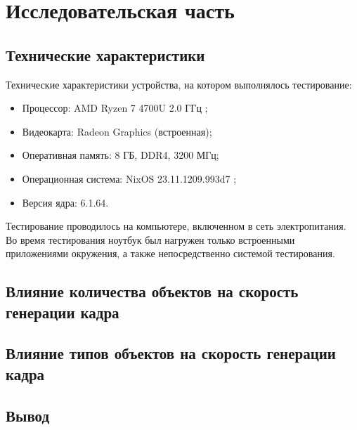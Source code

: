 \section{Исследовательская часть}


\subsection{Технические характеристики}

Технические характеристики устройства, на котором выполнялось тестирование:
\begin{itemize}
    \item Процессор: AMD Ryzen 7 4700U 2.0 ГГц \cite{amd};
    \item Видеокарта: Radeon Graphics (встроенная);
    \item Оперативная память: 8 ГБ, DDR4, 3200 МГц;
    \item Операционная система: NixOS 23.11.1209.993d7 \cite{nixos};
    \item Версия ядра: 6.1.64.
\end{itemize}

Тестирование проводилось на компьютере, включенном в сеть электропитания.
Во время тестирования ноутбук был нагружен только встроенными приложениями окружения, а также непосредственно системой тестирования.

\subsection{Влияние количества объектов на скорость генерации кадра}


\subsection{Влияние типов объектов на скорость генерации кадра}


\subsection*{Вывод}

